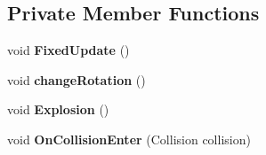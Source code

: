\subsection*{Private Member Functions}
\begin{DoxyCompactItemize}
\item 
\mbox{\label{class_wamonn_a1af397f9b6ed9807597a8901a06104f2}} 
void {\bfseries Fixed\+Update} ()
\item 
\mbox{\label{class_wamonn_a4d8110b4518864dd265328c519692f64}} 
void {\bfseries change\+Rotation} ()
\item 
\mbox{\label{class_wamonn_abd28f36a4bf3fc573436edd50737befe}} 
void {\bfseries Explosion} ()
\item 
\mbox{\label{class_wamonn_ad9475e2b393f43af9bbdd304cd3969e9}} 
void {\bfseries On\+Collision\+Enter} (Collision collision)
\end{DoxyCompactItemize}
